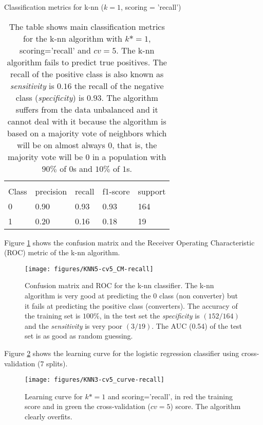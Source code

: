 \documentclass[11pt]{article}
\theoremstyle{definition}
\theoremstyle{remark}
\begin{document}
\begin{table}[H]
\caption{Classification metrics for k-nn ($k=1$, scoring = 'recall')} 
\begin{center} 
\begin{tabular}{lllll}
\hline
\multicolumn{1}{c}{} \\
Class & precision & recall & f1-score & support     \\
\hline
0 & 0.90  &    0.93   &   0.93   &    164 \\
1 & 0.20  &    0.16   &   0.18   &     19 \\
\hline
\end{tabular}
\caption{The table shows main classification metrics for the k-nn algorithm with $k*=1$, scoring='recall' and $cv=5$. The k-nn algorithm fails to predict true positives. The recall of the positive class is also known as \emph{sensitivity} is $0.16$ the recall of the negative class (\emph{specificity}) is $0.93$. The algorithm suffers from the data unbalanced and it cannot deal with it because the algorithm is based on a majority vote of neighbors which will be on almost always $0$, that is, the majority vote will be $0$ in a population with $90\%$ of $0$s and $10\%$ of $1$s.} \label{tab:knn} 
\end{center}
\end{table}

Figure \ref{fig:knn-cm} shows the confusion matrix and the Receiver Operating Characteristic (ROC) metric of the k-nn algorithm. 

\begin{figure}[H]
        \centering
        \texttt{[image: figures/KNN5-cv5\_CM-recall]}
        \caption{Confusion matrix and ROC for the k-nn classifier. The k-nn algorithm is very good at predicting the 0 class (non converter) but it fails at predicting the positive class (converters). The accuracy of the training set is $100\%$, in the test set the \emph{specificity} is $(152/164)$ and the \emph{sensitivity} is very poor $(3/19)$. The AUC (0.54) of the test set is as good as random guessing.
        }
\label{fig:knn-cm}
\end{figure}

Figure \ref{fig:knn-cv3} shows the learning curve for the logistic regression classifier using cross-validation (7 splits).
\begin{figure}[H]
        \centering
        \texttt{[image: figures/KNN3-cv5\_curve-recall]}
        \caption{Learning curve for $k*=1$ and scoring='recall', in red the training score and in green the cross-validation ($cv=5$) score. The algorithm clearly overfits.
        } \label{fig:knn-cv3}
\end{figure}
\end{document}
